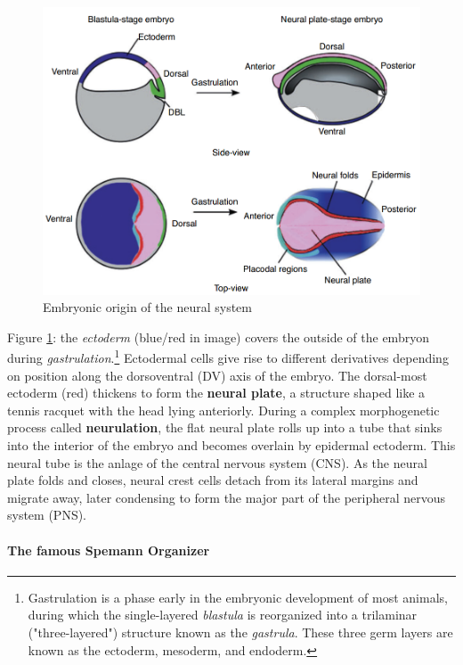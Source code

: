 \documentclass[12pt,article,oneside,a4paper]{memoir}
\begin{document}
\begin{figure}
	\centering
  	\includegraphics[width=\linewidth]{imgs/embryonic_origins_nervous_system.png}
	\caption{Embryonic origin of the neural system}
  	\label{fig:embrionicOriginNS}
\end{figure}

Figure \ref{fig:embrionicOriginNS}: the \textit{ectoderm} (blue/red in image) covers the outside of the embryon during \textit{gastrulation}.\footnote{Gastrulation is a phase early in the embryonic development of most animals, during which the single-layered \textit{blastula} is reorganized into a trilaminar ("three-layered") structure known as the \textit{gastrula}. These three germ layers are known as the ectoderm, mesoderm, and endoderm.} Ectodermal cells give rise to different derivatives depending on position along the dorsoventral (DV) axis of the embryo. The dorsal-most ectoderm (red) thickens to form the \textbf{neural plate}, a structure shaped like a tennis racquet with the head lying anteriorly. During a complex morphogenetic process called \textbf{neurulation}, the flat neural plate rolls up into a tube that sinks into the interior of the embryo and becomes overlain by epidermal ectoderm. This neural tube is the anlage of the central nervous system (CNS). As the neural plate folds and closes, neural crest cells detach from its lateral margins and migrate away, later condensing to form the major part of the peripheral nervous system (PNS).

\paragraph{The famous Spemann Organizer}
\end{document}
